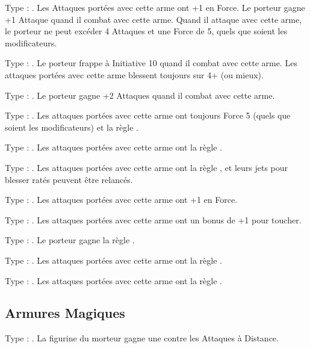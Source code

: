 Type : \hw{}. Les Attaques portées avec cette arme ont +1 en Force. Le porteur gagne +1 Attaque quand il combat avec cette arme. Quand il attaque avec cette arme, le porteur ne peut excéder 4 Attaques et une Force de 5, quels que soient les modificateurs.

Type : \hw{}. Le porteur frappe à Initiative 10 quand il combat avec cette arme. Les attaques portées avec cette arme blessent toujours sur 4+ (ou mieux).

\columnbreak

Type : \hw{}. Le porteur gagne +2 Attaques quand il combat avec cette arme.

Type : \halberd{}. Les attaques portées avec cette arme ont toujours Force 5 (quels que soient les modificateurs) et la règle .

Type : \gw{}. Les attaques portées avec cette arme ont la règle .

Type : \hw{}. Les attaques portées avec cette arme ont la règle \divineattacks{}, et leurs jets pour blesser ratés peuvent être relancés.

Type : \hw{}. Les attaques portées avec cette arme ont +1 en Force.

Type : \hw{}. Les attaques portées avec cette arme ont un bonus de +1 pour toucher.

Type : \pw{}. Le porteur gagne la règle \fear{}.

Type : \lance{}. Les attaques portées avec cette arme ont la règle \flamingattacks{}.

Type : \hw{}. Les attaques portées avec cette arme ont la règle .

\endpricelist

\newpage
\hypertarget{magicalarmour}{\subsection{Armures Magiques}}
\label{magical_armour}

\startpricelist

Type : \shield{}. La figurine du morteur gagne une  contre les Attaques à Distance.

